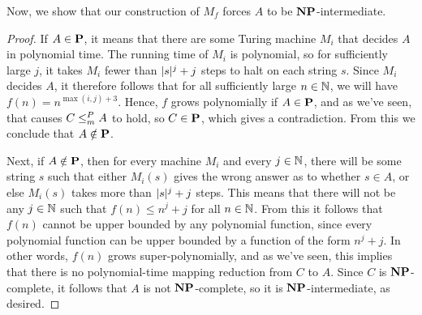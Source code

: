 Now, we show that our construction of $M_f$ forces $A$ to be $\textbf{NP}$-intermediate.

\begin{proof}
  If $A \in \textbf{P}$, it means that there are some Turing machine $M_i$ that decides $A$ in polynomial time. The running time of $M_i$ is polynomial, so for sufficiently large $j$, it takes $M_i$ fewer than $| s |^j + j$ steps to halt on each string $s$. Since $M_i$ decides $A$, it therefore follows that for all sufficiently large $n \in \mathbb N$, we will have $f(n) = n^{\max(i, j) + 3}$. Hence, $f$ grows polynomially if $A \in \textbf{P}$, and as we've seen, that causes $C \leq_m^P A$ to hold, so $C \in \textbf{P}$, which gives a contradiction. From this we conclude that $A \notin \textbf{P}$.

  Next, if $A \notin \textbf{P}$, then for every machine $M_i$ and every $j \in \mathbb N$, there will be some string $s$ such that either $M_i(s)$ gives the wrong answer as to whether $s \in A$, or else $M_i(s)$ takes more than $| s |^j + j$ steps. This means that there will not be any $j \in \mathbb N$ such that $f(n) \leq n^j + j$ for all $n \in \mathbb N$. From this it follows that $f(n)$ cannot be upper bounded by any polynomial function, since every polynomial function can be upper bounded by a function of the form $n^j + j$. In other words, $f(n)$ grows super-polynomially, and as we've seen, this implies that there is no polynomial-time mapping reduction from $C$ to $A$. Since $C$ is $\textbf{NP}$-complete, it follows that $A$ is not $\textbf{NP}$-complete, so it is $\textbf{NP}$-intermediate, as desired.
\end{proof}

